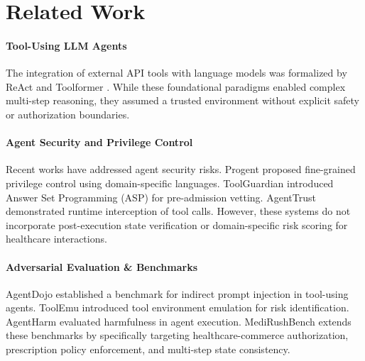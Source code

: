 \section{Related Work}
\label{sec:related_work}

\paragraph{Tool-Using LLM Agents}
The integration of external API tools with language models was formalized by ReAct \cite{react2023} and Toolformer \cite{toolformer2023}. While these foundational paradigms enabled complex multi-step reasoning, they assumed a trusted environment without explicit safety or authorization boundaries.

\paragraph{Agent Security and Privilege Control}
Recent works have addressed agent security risks. Progent \cite{progent2025} proposed fine-grained privilege control using domain-specific languages. ToolGuardian \cite{toolguardian2026} introduced Answer Set Programming (ASP) for pre-admission vetting. AgentTrust \cite{agenttrust2026} demonstrated runtime interception of tool calls. However, these systems do not incorporate post-execution state verification or domain-specific risk scoring for healthcare interactions.

\paragraph{Adversarial Evaluation & Benchmarks}
AgentDojo \cite{agentdojo2024} established a benchmark for indirect prompt injection in tool-using agents. ToolEmu \cite{toolemu2024} introduced tool environment emulation for risk identification. AgentHarm \cite{agentharm2024} evaluated harmfulness in agent execution. MediRushBench extends these benchmarks by specifically targeting healthcare-commerce authorization, prescription policy enforcement, and multi-step state consistency.
